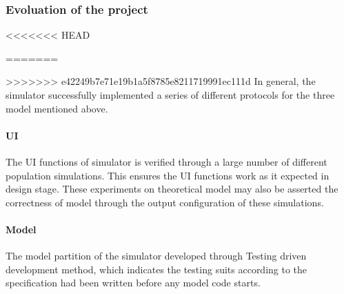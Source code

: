 \subsubsection{Evoluation of the project}
<<<<<<< HEAD
\par\noindent
=======
\par
>>>>>>> e42249b7e71e19b1a5f8785e8211719991ec111d
In general, the simulator successfully implemented a series of different protocols for the three model mentioned above.

\paragraph{UI} The UI functions of simulator is verified through a large number of different population simulations. This ensures the UI functions work as it expected in design stage.
These experiments on theoretical model may also be asserted the correctness of model through the output configuration of these simulations.

\paragraph{Model} The model partition of the simulator developed through Testing driven development method, which indicates the testing suits according to the specification had been written before any
model code starts.
